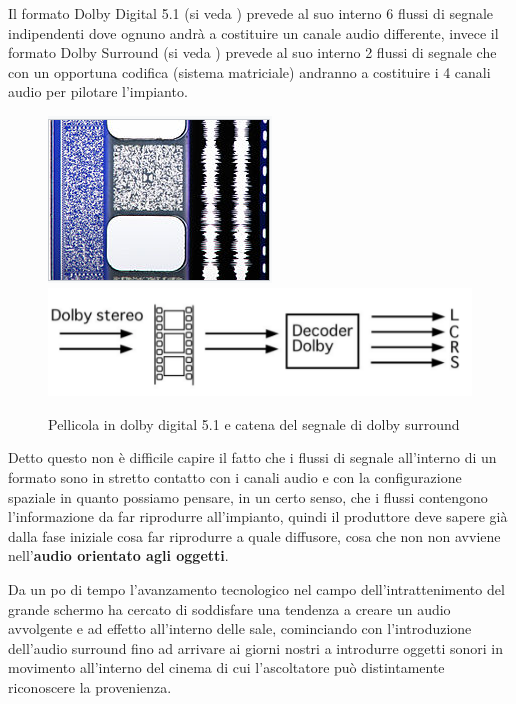 \documentclass[12pt,a4paper]{report}
\begin{document}
Il formato Dolby Digital 5.1 (si veda \cite{digital}) prevede al suo interno 6 flussi di segnale indipendenti dove ognuno andrà a costituire un canale audio differente, invece il formato Dolby Surround (si veda \cite{surround}) prevede al suo interno 2 flussi di segnale che con un opportuna codifica (sistema matriciale) andranno a costituire i 4 canali audio per pilotare l'impianto. 

\begin{figure}[htbp]
	\centering
	\includegraphics[scale=0.5]{figures/pellicola.png} \ \ \ \ \ \ \ \ \ \ \ \ \ \ \ \ \includegraphics[scale=0.5]{figures/dolbysurround.png}
	\caption {Pellicola in dolby digital 5.1 e catena del segnale di dolby surround}
	\label{fig:pellicola}
	\end{figure}

Detto questo non è difficile capire il fatto che i flussi di segnale all'interno di un formato sono in stretto contatto con i canali audio e con la configurazione spaziale in quanto possiamo pensare, in un certo senso, che i flussi contengono l'informazione da far riprodurre all'impianto, quindi il produttore deve sapere già dalla fase iniziale cosa far riprodurre a quale diffusore, cosa che non non avviene nell'\textbf{audio orientato agli oggetti}.

Da un po di tempo l'avanzamento tecnologico nel campo dell'intrattenimento del grande schermo ha cercato di soddisfare una tendenza a creare un audio avvolgente e ad effetto all'interno delle sale, cominciando con l'introduzione dell'audio surround fino ad arrivare ai giorni nostri a introdurre oggetti sonori in movimento all'interno del cinema di cui l'ascoltatore può distintamente riconoscere la provenienza.
\end{document}
